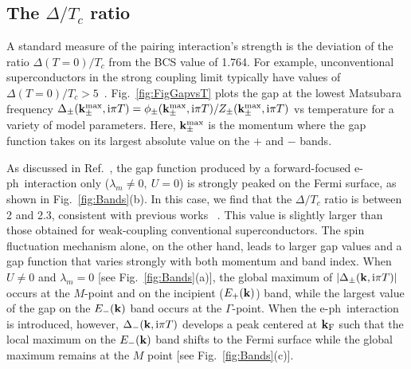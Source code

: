 \documentclass[%
 reprint,
 superscriptaddress,
nofootinbib,
nobibnotes,
 amsmath,amssymb,
 aps,
 prb,
 dvipsnames, 
 floatfix
]{revtex4-2}
\newcommand{\eph}{e-ph}
\begin{document}
\subsection{The $\Delta/T_c$ ratio}
A standard measure of the pairing interaction's strength is the deviation of the ratio $\Delta(T=0)/T_c$ from the BCS value of 1.764. For example, unconventional superconductors in the strong coupling limit typically have values of $\Delta(T=0)/T_c > 5$~\cite{Inosov:2011bj}.  
Fig.~\ref{fig:FigGapvsT} plots the gap at the lowest Matsubara frequency $\Delta_\pm({\bf k}^\text{max}_\pm,\text{i}\pi T) = \phi_\pm({\bf k}^\text{max}_\pm,\text{i}\pi T) / Z_\pm({\bf k}^\text{max}_\pm,\text{i}\pi T)$ vs temperature for a variety of model parameters. 
Here, ${\bf k}^\text{max}_\pm$ is the momentum where the gap function takes on its largest 
absolute value on the $+$ and $-$ bands. 

As discussed in Ref.~\cite{WangSUST}, the gap function produced by a 
forward-focused \eph~interaction only ($\lambda_m \ne 0,~U=0$) is strongly peaked on the 
Fermi surface, as shown in Fig.~\ref{fig:Bands}(b). In this case, we find that the $\Delta/T_c$ ratio 
is between 2 and 2.3, consistent with previous works ~\cite{WangSUST,Schrodi:2020bq}. 
This value is slightly larger than those obtained for weak-coupling conventional superconductors. 
The spin fluctuation mechanism alone, on the other hand, leads to larger gap values and 
a gap function that varies strongly with both momentum and band index. 
When $U \ne 0$ and $\lambda_m = 0$ [see Fig.~\ref{fig:Bands}(a)], the global maximum 
of $|\Delta_\pm({\bf k},\text{i}\pi T)|$ occurs at the $M$-point and on the incipient ($E_+({\bf k})$) band, while the largest value of the gap on the $E_-({\bf k})$ band occurs at the $\Gamma$-point.  
When the \eph~interaction is introduced, however, $\Delta_{-}({\bf k},\text{i}\pi T)$ develops a peak centered at ${\bf k}_\mathrm{F}$ such that the local maximum on the $E_-({\bf k})$ band  
shifts to the Fermi surface while the global maximum remains at the $M$ point [see Fig.~\ref{fig:Bands}(c)]. 
\end{document}
